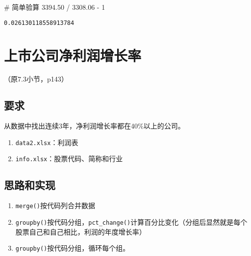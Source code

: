 \documentclass[
  letterpaper,
  DIV=11,
  numbers=noendperiod]{scrreprt}
\newenvironment{Shaded}{\begin{snugshade}}{\end{snugshade}}
\newcommand{\CommentTok}[1]{\textcolor[rgb]{0.37,0.37,0.37}{#1}}
\newcommand{\DecValTok}[1]{\textcolor[rgb]{0.68,0.00,0.00}{#1}}
\newcommand{\FloatTok}[1]{\textcolor[rgb]{0.68,0.00,0.00}{#1}}
\newcommand{\OperatorTok}[1]{\textcolor[rgb]{0.37,0.37,0.37}{#1}}
\providecommand{\tightlist}{%
  \setlength{\itemsep}{0pt}\setlength{\parskip}{0pt}}\usepackage{longtable,booktabs,array}
\begin{document}
\begin{Shaded}
\begin{Highlighting}[]
\CommentTok{\# 简单验算}
\FloatTok{3394.50} \OperatorTok{/} \FloatTok{3308.06} \OperatorTok{{-}} \DecValTok{1}
\end{Highlighting}
\end{Shaded}

\begin{verbatim}
0.026130118558913784
\end{verbatim}

\hypertarget{ux4e0aux5e02ux516cux53f8ux51c0ux5229ux6da6ux589eux957fux7387}{%
\section{上市公司净利润增长率}\label{ux4e0aux5e02ux516cux53f8ux51c0ux5229ux6da6ux589eux957fux7387}}

（原7.3小节，p143）

\hypertarget{ux8981ux6c42-1}{%
\subsection{要求}\label{ux8981ux6c42-1}}

从数据中找出连续3年，净利润增长率都在40\%以上的公司。

\begin{enumerate}
\def\labelenumi{\arabic{enumi}.}
\tightlist
\item
  \texttt{data2.xlsx}：利润表
\item
  \texttt{info.xlsx}：股票代码、简称和行业
\end{enumerate}

\hypertarget{ux601dux8defux548cux5b9eux73b0-1}{%
\subsection{思路和实现}\label{ux601dux8defux548cux5b9eux73b0-1}}

\begin{enumerate}
\def\labelenumi{\arabic{enumi}.}
\tightlist
\item
  \texttt{merge()}按代码列合并数据
\item
  \texttt{groupby()}按代码分组，\texttt{pct\_change()}计算百分比变化（分组后显然就是每个股票自己和自己相比，利润的年度增长率）
\item
  \texttt{groupby()}按代码分组，循环每个组。
\end{enumerate}
\end{document}
